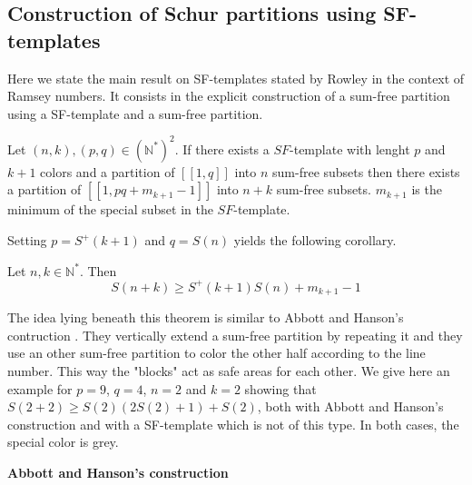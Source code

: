 \subsection{Construction of Schur partitions using SF-templates}

\qquad Here we state the main result on SF-templates stated by Rowley in the context of Ramsey numbers. It consists 
in the explicit construction of a sum-free partition using a SF-template and a sum-free partition.

\begin{theorem}
	Let \((n,k), (p,q) \in (\mathbb{N}^*)^2\). If there exists a \(SF\)-template with lenght \(p\) and \(k+1\) colors 
	and a partition of \([\![1,q]\!]\) into \(n\) sum-free subsets then there exists a partition of \([\![1,pq+m_{k+1}
	-1]\!]\) into \(n+k\) sum-free subsets. \(m_{k+1}\) is the minimum of the special subset in the \(SF\)-template.
\end{theorem}

Setting \(p = S^+(k+1)\) and \(q = S(n)\) yields the following corollary.

\begin{corollary}
	Let \(n, k \in \mathbb{N}^*\). Then
	\[ S(n+k) \geqslant S^+(k+1)S(n) + m_{k+1} - 1 \]
\end{corollary}

The idea lying beneath this theorem is similar to Abbott and Hanson's contruction \cite{AbbottHanson}. They vertically 
extend a sum-free partition by repeating it and they use an other sum-free partition to color the other half according 
to the line number. This way the "blocks" act as safe areas for each other. We give here an example for \(p = 9\), 
\(q = 4\), \(n = 2\) and \(k = 2\) showing that \(S(2 + 2) \geqslant S(2) (2 S(2) + 1) + S(2)\), both with Abbott 
and Hanson's construction and with a SF-template which is not of this type. In both cases, the special color is grey.

\begin{center}
\textbf{Abbott and Hanson's construction}
\end{center}

